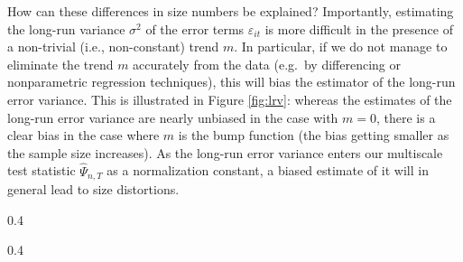 \documentclass[a4paper,12pt]{article}
\begin{document}
\begin{enumerate}[label=\arabic*.,leftmargin=0.6cm]
How can these differences in size numbers be explained? Importantly, estimating the long-run variance $\sigma^2$ of the error terms $\varepsilon_{it}$ is more difficult in the presence of a non-trivial (i.e., non-constant) trend $m$. In particular, if we do not manage to eliminate the trend $m$ accurately from the data (e.g.\ by differencing or nonparametric regression techniques), this will bias the estimator of the long-run error variance. This is illustrated in Figure \ref{fig:lrv}: whereas the estimates of the long-run error variance are nearly unbiased in the case with $m = 0$, there is a clear bias in the case where $m$ is the bump function (the bias getting smaller as the sample size increases). As the long-run error variance enters our multiscale test statistic $\widehat{\Psi}_{n,T}$ as a normalization constant, a biased estimate of it will in general lead to size distortions. 


\begin{table}[t!]
\renewcommand{\arraystretch}{1.2}  
{\footnotesize
\caption{Empirical size numbers with $m$ the zero and the bump function.}\label{tab:size}
\begin{subtable}[b]{0.4\textwidth}
\centering  
\caption{zero function}

\end{subtable}
\begin{subtable}[b]{0.4\textwidth}
\centering  
\caption{bump function}

\end{subtable}}
\end{table}


\end{enumerate}
\end{document}
